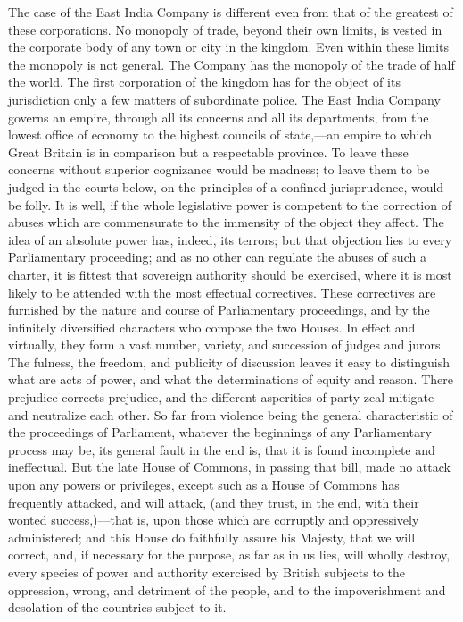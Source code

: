 {The case of the East India Company is different even from that of the greatest of these corporations. No monopoly of trade, beyond their own limits, is vested in the corporate body of any town or city in the kingdom. Even within these limits the monopoly is not general. The Company has the monopoly of the trade of half the world. The first corporation of the kingdom has for the object of its jurisdiction only a few matters of subordinate police. The East India Company governs an empire, through all its concerns and all its departments, from the lowest office of economy to the highest councils of state,—an empire to which Great Britain is in comparison but a respectable province. To leave these concerns without superior cognizance would be madness; to leave them to be judged in the courts below, on the principles of a confined jurisprudence, would be folly. It is well, if the whole legislative power is competent to the correction of abuses which are commensurate to the immensity of the object they affect. The idea of an absolute power has, indeed, its terrors; but that objection lies to every Parliamentary proceeding; and as no other can regulate the abuses of such a charter, it is fittest that sovereign authority should be exercised, where it is most likely to be attended with the most effectual correctives. These correctives are furnished by the nature and course of Parliamentary proceedings, and by the infinitely diversified characters who compose the two Houses. In effect and virtually, they form a vast number, variety, and succession of judges and jurors. The fulness, the freedom, and publicity of discussion leaves it easy to distinguish what are acts of power, and what the determinations of equity and reason. There prejudice corrects prejudice, and the different asperities of party zeal mitigate and neutralize each other. So far from violence being the general characteristic of the proceedings of Parliament, whatever the beginnings of any Parliamentary process may be, its general fault in the end is, that it is found incomplete and ineffectual.
}
 But the late House of Commons, in passing that bill, made no attack upon any powers or privileges, except such as a House of Commons has frequently attacked, and will attack, (and they trust, in the end, with their wonted success,)—that is, upon those which are corruptly and oppressively administered; and this House do faithfully assure his Majesty, that we will correct, and, if necessary for the purpose, as far as in us lies, will wholly destroy, every species of power and authority exercised by British subjects to the oppression, wrong, and detriment of the people, and to the impoverishment and desolation of the countries subject to it.

